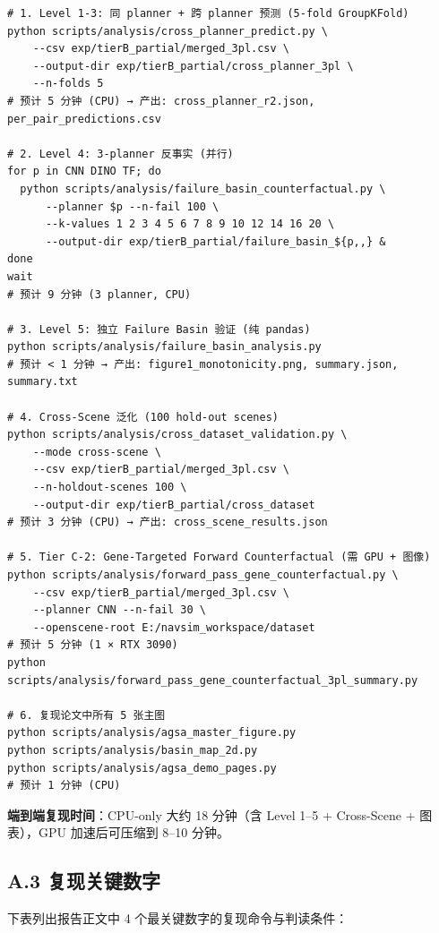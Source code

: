 \documentclass[a4paper,12pt,fontset=fandol]{ctexart}
\begin{document}
{\begin{verbatim}
# 1. Level 1-3: 同 planner + 跨 planner 预测 (5-fold GroupKFold)
python scripts/analysis/cross_planner_predict.py \
    --csv exp/tierB_partial/merged_3pl.csv \
    --output-dir exp/tierB_partial/cross_planner_3pl \
    --n-folds 5
# 预计 5 分钟 (CPU) → 产出: cross_planner_r2.json, per_pair_predictions.csv

# 2. Level 4: 3-planner 反事实 (并行)
for p in CNN DINO TF; do
  python scripts/analysis/failure_basin_counterfactual.py \
      --planner $p --n-fail 100 \
      --k-values 1 2 3 4 5 6 7 8 9 10 12 14 16 20 \
      --output-dir exp/tierB_partial/failure_basin_${p,,} &
done
wait
# 预计 9 分钟 (3 planner, CPU)

# 3. Level 5: 独立 Failure Basin 验证 (纯 pandas)
python scripts/analysis/failure_basin_analysis.py
# 预计 < 1 分钟 → 产出: figure1_monotonicity.png, summary.json, summary.txt

# 4. Cross-Scene 泛化 (100 hold-out scenes)
python scripts/analysis/cross_dataset_validation.py \
    --mode cross-scene \
    --csv exp/tierB_partial/merged_3pl.csv \
    --n-holdout-scenes 100 \
    --output-dir exp/tierB_partial/cross_dataset
# 预计 3 分钟 (CPU) → 产出: cross_scene_results.json

# 5. Tier C-2: Gene-Targeted Forward Counterfactual (需 GPU + 图像)
python scripts/analysis/forward_pass_gene_counterfactual.py \
    --csv exp/tierB_partial/merged_3pl.csv \
    --planner CNN --n-fail 30 \
    --openscene-root E:/navsim_workspace/dataset
# 预计 5 分钟 (1 × RTX 3090)
python scripts/analysis/forward_pass_gene_counterfactual_3pl_summary.py

# 6. 复现论文中所有 5 张主图
python scripts/analysis/agsa_master_figure.py
python scripts/analysis/basin_map_2d.py
python scripts/analysis/agsa_demo_pages.py
# 预计 1 分钟 (CPU)
\end{verbatim}

\noindent\textbf{端到端复现时间}：CPU-only 大约 18 分钟（含 Level 1--5 +
Cross-Scene + 图表），GPU 加速后可压缩到 8--10 分钟。

\subsection*{A.3 复现关键数字}

下表列出报告正文中 4 个最关键数字的复现命令与判读条件：

}
\end{document}
